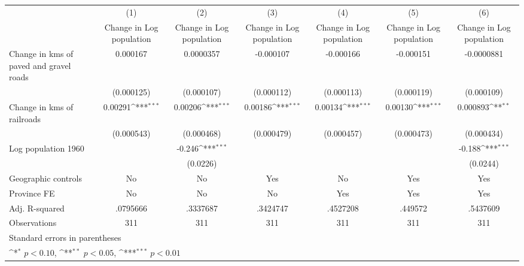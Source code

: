 {
\def\sym#1{\ifmmode^{#1}\else\(^{#1}\)\fi}
\begin{tabular}{l*{6}{c}}
\hline\hline
                    &\multicolumn{1}{c}{(1)}&\multicolumn{1}{c}{(2)}&\multicolumn{1}{c}{(3)}&\multicolumn{1}{c}{(4)}&\multicolumn{1}{c}{(5)}&\multicolumn{1}{c}{(6)}\\
                    &\multicolumn{1}{c}{Change in Log population}&\multicolumn{1}{c}{Change in Log population}&\multicolumn{1}{c}{Change in Log population}&\multicolumn{1}{c}{Change in Log population}&\multicolumn{1}{c}{Change in Log population}&\multicolumn{1}{c}{Change in Log population}\\
\hline
Change in kms of paved and gravel roads&    0.000167         &   0.0000357         &   -0.000107         &   -0.000166         &   -0.000151         &  -0.0000881         \\
                    &  (0.000125)         &  (0.000107)         &  (0.000112)         &  (0.000113)         &  (0.000119)         &  (0.000109)         \\
[1em]
Change in kms of railroads&     0.00291\sym{***}&     0.00206\sym{***}&     0.00186\sym{***}&     0.00134\sym{***}&     0.00130\sym{***}&    0.000893\sym{**} \\
                    &  (0.000543)         &  (0.000468)         &  (0.000479)         &  (0.000457)         &  (0.000473)         &  (0.000434)         \\
[1em]
Log population 1960 &                     &      -0.246\sym{***}&                     &                     &                     &      -0.188\sym{***}\\
                    &                     &    (0.0226)         &                     &                     &                     &    (0.0244)         \\
\hline
Geographic controls &          No         &          No         &         Yes         &          No         &         Yes         &         Yes         \\
Province FE         &          No         &          No         &          No         &         Yes         &         Yes         &         Yes         \\
Adj. R-squared      &    .0795666         &    .3337687         &    .3424747         &    .4527208         &     .449572         &    .5437609         \\
Observations        &         311         &         311         &         311         &         311         &         311         &         311         \\
\hline\hline
\multicolumn{7}{l}{\footnotesize Standard errors in parentheses}\\
\multicolumn{7}{l}{\footnotesize \sym{*} \(p<0.10\), \sym{**} \(p<0.05\), \sym{***} \(p<0.01\)}\\
\end{tabular}
}
